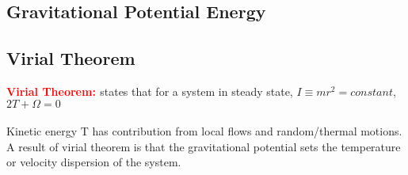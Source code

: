 \documentclass[10pt,a4paper]{article}
\newcommand{\theorem}[2]{\textbf{\textcolor{red}{#1: }}{#2}\\ \\}
\begin{document}
\subsection{Gravitational Potential Energy}
\subsection{Virial Theorem}
\theorem{Virial Theorem}{ states that for a system in steady state, $I\equiv mr^2 =constant $, $2T+\Omega =0 $}
Kinetic energy T has contribution from local flows and random/thermal motions.\\
A result of virial theorem is that the gravitational potential sets the temperature or velocity dispersion of the system.
\end{document}
